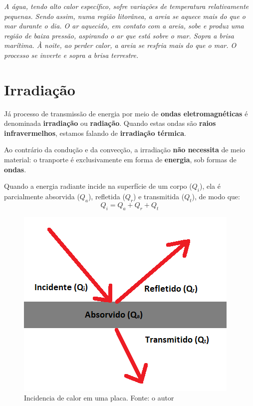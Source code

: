 \documentclass[12pt,twoside]{article}
\newenvironment{resposta*}
{\bf Resposta:\\ }
{}
\begin{document}
\begin{resposta*}
{\it A água, tendo alto calor específico, sofre variações de temperatura relativamente pequenas. Sendo assim, numa região litorânea, a areia se aquece mais do que o mar durante o dia. O ar aquecido, em contato com a areia, sobe e produz uma região de baixa pressão, aspirando o ar que está sobre o mar. Sopra a brisa marítima. À noite, ao perder calor, a areia se resfria mais do que o mar. O processo se inverte e sopra a brisa terrestre.}
\end{resposta*}

\hypertarget{x-irradiação}{\section{Irradiação}}
Já processo de transmissão de energia por meio de \textbf{ondas eletromagnéticas} é denominada \textbf{irradiação} ou \textbf{radiação}. Quando estas ondas são \textbf{raios infravermelhos}, estamos falando de \textbf{irradiação térmica}.


Ao contrário da condução e da convecção, a irradiação \textbf{não necessita} de meio material: o tranporte é exclusivamente em forma de \textbf{energia}, sob formas de \textbf{ondas}.


Quando a energia radiante incide na superfície de um corpo (\textbf{$Q_{i}$}), ela é parcialmente absorvida (\textbf{$Q_{a}$}), refletida (\textbf{$Q_{r}$}) e transmitida (\textbf{$Q_{t}$}), de modo que: \[Q_{i}=Q_{a}+Q_{r}+Q_{t}\]


\begin{figure}[ht]{}
\centering\includegraphics[width=2.5truein]{placa.png}
\caption{Incidencia de calor em uma placa. Fonte: o autor}

\end{figure}
\end{document}
